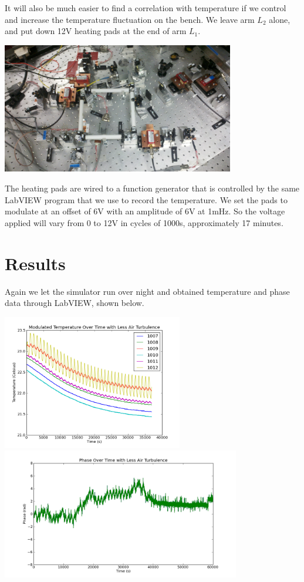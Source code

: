 \documentclass[11 pt]{article}
\begin{document}
It will also be much easier to find a correlation with temperature if we control and increase the temperature fluctuation on the bench. We leave arm $L_2$ alone, and put down 12V heating pads at the end of arm $L_1$.\begin{center} \includegraphics[width=4in]{heatingpads.jpg}\\\end{center}The heating pads are wired to a function generator that is controlled by the same LabVIEW program that we use to record the temperature. We set the pads to modulate at an offset of 6V with an amplitude of 6V at 1mHz. So the voltage applied will vary from 0 to 12V in cycles of 1000s, approximately 17 minutes.

\section{Results}
\indent\indent Again we let the simulator run over night and obtained temperature and phase data through LabVIEW, shown below.
\begin{flushleft}\includegraphics[width=3.1in]{ModulatedTemp.png}\includegraphics[width=4.1in]{phase260711.png}\\\end{flushleft}
\end{document}
